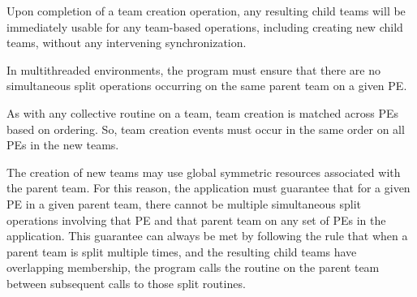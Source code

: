 Upon completion of a team creation operation, any resulting child teams will be
immediately usable for any team-based operations, including creating new child teams,
without any intervening synchronization.

In multithreaded environments, the program must ensure that there
are no simultaneous split operations occurring on the same parent team on a
given \ac{PE}.

As with any collective routine on a team, team creation is matched across \acp{PE} based
on ordering. So, team creation events must occur in the same order on all \acp{PE}
in the new teams.

The creation of new teams may use global symmetric resources associated with
the parent team. For this reason, the application must guarantee that for
a given \ac{PE} in a given parent team, there cannot be multiple simultaneous
split operations involving that \ac{PE} and that parent team on any set of \acp{PE}
in the \openshmem application.
This guarantee can always be met by following the rule that when a parent team
is split multiple times, and the resulting child teams have overlapping membership,
the program calls the  routine on the parent team
between subsequent calls to those split routines.
